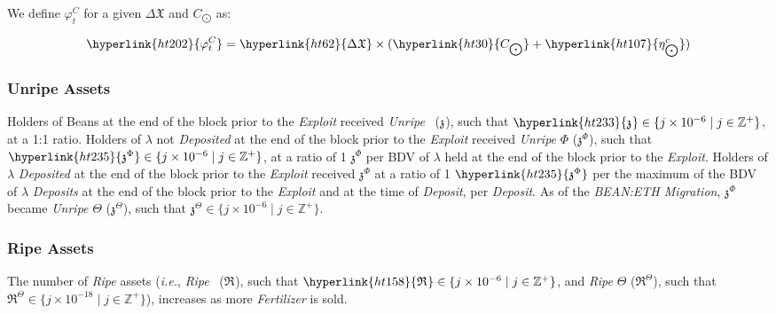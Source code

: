 \documentclass[tikz]{article}
\newcommand{\term}[1]{\textsl{#1}}
\newcommand{\Bean}{} %
\newcommand{\bean}{} %
\begin{document}
We define \hyperlink{ht202}{${\varphi}_t^C$} for a given \hyperlink{ht62}{$\Delta \mathfrak{X}$} and \hyperlink{ht30}{$C_{\bigodot}$} as:

    $$
        \hyperlink{ht202}{{\varphi}_t^C} = \hyperlink{ht62}{\Delta \mathfrak{X}} \times 
                                    (\hyperlink{ht30}{C_{\bigodot}} + \hyperlink{ht107}{\eta_{\bigodot}^c})
    $$

\subsubsection{Unripe Assets}

Holders of Beans at the end of the block prior to the \term{Exploit} received \term{Unripe} \Bean\ (\hyperlink{ht229}{$\mathfrak{z}^{\bean}$}), such that $\hyperlink{ht233}{\mathfrak{z}^{\bean}} \in \{j \times 10^{-6} \mid j \in \mathbb{Z}^{+} \}$, at a 1:1 ratio. Holders of \hyperlink{ht126}{$\lambda$} not \term{Deposited} at the end of the block prior to the \term{Exploit} received \term{Unripe} \hyperlink{ht187}{$\Phi$} (\hyperlink{ht235}{$\mathfrak{z}^{\Phi}$}), such that $\hyperlink{ht235}{\mathfrak{z}^{\Phi}} \in \{j \times 10^{-6} \mid j \in \mathbb{Z}^{+} \}$, at a ratio of 1 \hyperlink{ht235}{$\mathfrak{z}^{\Phi}$} per BDV of \hyperlink{ht126}{$\lambda$} held at the end of the block prior to the \term{Exploit}. Holders of \hyperlink{ht126}{$\lambda$} \term{Deposited} at the end of the block prior to the \term{Exploit} received \hyperlink{ht235}{$\mathfrak{z}^{\Phi}$} at a ratio of 1 $\hyperlink{ht235}{\mathfrak{z}^{\Phi}}$ per the maximum of the BDV of \hyperlink{ht126}{$\lambda$} \term{Deposits} at the end of the block prior to the \term{Exploit} and at the time of \term{Deposit}, per \term{Deposit}. As of the \term{BEAN:ETH Migration}, $\mathfrak{z}^{\Phi}$ became \term{Unripe} $\Theta$ (\hyperlink{ht235}{$\mathfrak{z}^{\Theta}$}), such that $\mathfrak{z}^{\Theta} \in \{j \times 10^{-6} \mid j \in \mathbb{Z}^{+} \}$.

\subsubsection{Ripe Assets}

The number of \term{Ripe} assets (\term{i.e.}, \term{Ripe} \Bean\ (\hyperlink{ht158}{$\mathfrak{R}^{\bean}$}), such that $\hyperlink{ht158}{\mathfrak{R}^{\bean}} \in \{j \times 10^{-6} \mid j \in \mathbb{Z}^{+} \}$, and \term{Ripe} $\Theta$ ($\mathfrak{R}^{\Theta}$), such that $\mathfrak{R}^{\Theta} \in \{j \times 10^{-18} \mid j \in \mathbb{Z}^{+} \}$), increases as more \term{Fertilizer} is sold.
\end{document}
